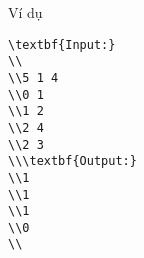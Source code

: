 Ví dụ
\begin{verbatim}
\textbf{Input:}
\\
\\5 1 4
\\0 1
\\1 2
\\2 4
\\2 3
\\\textbf{Output:}
\\1
\\1
\\1
\\0
\\\end{verbatim}